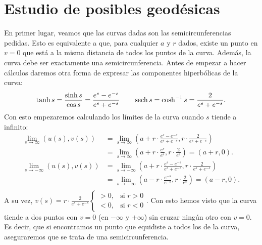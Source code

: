 \section{Estudio de posibles geodésicas}
En primer lugar, veamos que las curvas dadas son las semicircunferencias
pedidas. Esto es equivalente a que, para cualquier $a$ y $r$ dados, existe un
punto en $v = 0$ que está a la misma distancia de todos los puntos de la curva.
Además, la curva debe ser exactamente una semicircunferencia. Antes de empezar
a hacer cálculos daremos otra forma de expresar las componentes hiperbólicas de
la curva:
\[
\tanh s = \frac{\sinh s}{\cos s} = \frac{e^s - e^{-s}}{e^{s} + e^{-s}}\qquad
\operatorname{sech} s = \cosh^{-1} s = \frac{2}{e^s + e^{-s}}.
\]
Con esto empezaremos calculando los límites de la curva cuando $s$ tiende a
infinito:
\begin{align*}
    \lim_{s \rightarrow \infty} \left( u\left( s \right), v\left( s \right)
    \right) &= \lim_{s \rightarrow \infty} \left( a + r \cdot \frac{e^s -
    e^{-s}}{e^s + e^{-s}}, r \cdot \frac{2}{e^s + e^{-s}} \right)\\
    &= \lim_{s \rightarrow \infty} \left( a + r \cdot \frac{e^s}{e^s}, r
    \cdot \frac{2}{e^s} \right) = \left( a + r, 0 \right).\\
    \lim_{s \rightarrow -\infty} \left( u\left( s \right), v\left( s \right)
    \right) &= \lim_{s \rightarrow -\infty} \left( a + r \cdot \frac{e^s -
    e^{-s}}{e^s + e^{-s}}, r \cdot \frac{2}{e^s + e^{-s}} \right)\\
    &= \lim_{s \rightarrow -\infty} \left( a - r \cdot \frac{e^{-s}}{e^{-s}}, r
    \cdot \frac{2}{e^s} \right) = \left( a - r, 0 \right).\\
\end{align*}
A su vez, $v\left( s \right) = r \cdot \frac{2}{e^s + e^{-s}} \begin{cases}
    > 0, &\text{si } r > 0\\
    < 0, &\text{si } r < 0
\end{cases}$. Con esto hemos visto que la curva tiende a dos puntos con $v = 0$ (en
$-\infty$ y $+\infty$) sin cruzar ningún otro con $v = 0$. Es decir, que si
encontramos un punto que equidiste a todos los de la curva, aseguraremos que se
trata de una semicircunferencia.

